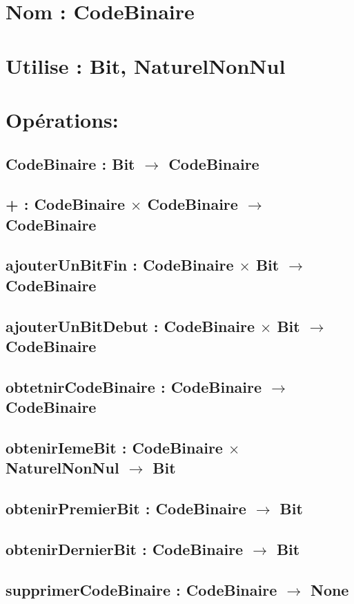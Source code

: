 \documentclass{article}
\begin{document}
\section*{Nom : CodeBinaire}
\section*{Utilise : Bit, NaturelNonNul}
\section*{Opérations:}

\subsection*{CodeBinaire : Bit $\to$ CodeBinaire}
\subsection*{+ : CodeBinaire $\times$ CodeBinaire $\to$ CodeBinaire}
\subsection*{ajouterUnBitFin : CodeBinaire $\times$ Bit $\to$ CodeBinaire}
\subsection*{ajouterUnBitDebut : CodeBinaire $\times$ Bit $\to$ CodeBinaire}
\subsection*{obtetnirCodeBinaire : CodeBinaire $\to$ CodeBinaire}
\subsection*{obtenirIemeBit : CodeBinaire $\times$ NaturelNonNul $\to$ Bit}
\subsection*{obtenirPremierBit : CodeBinaire $\to$ Bit}
\subsection*{obtenirDernierBit : CodeBinaire $\to$ Bit}
\subsection*{supprimerCodeBinaire : CodeBinaire $\to$ None}
\end{document}
